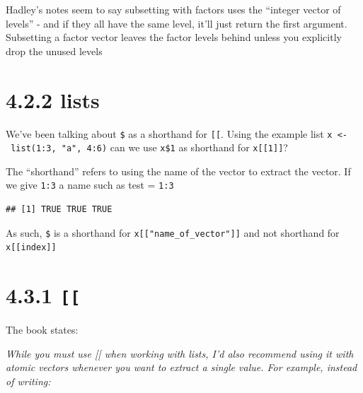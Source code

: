 \documentclass[]{book}
\newenvironment{Shaded}{\begin{snugshade}}{\end{snugshade}}
\newcommand{\DataTypeTok}[1]{\textcolor[rgb]{0.13,0.29,0.53}{#1}}
\newcommand{\DecValTok}[1]{\textcolor[rgb]{0.00,0.00,0.81}{#1}}
\newcommand{\KeywordTok}[1]{\textcolor[rgb]{0.13,0.29,0.53}{\textbf{#1}}}
\newcommand{\NormalTok}[1]{#1}
\newcommand{\OperatorTok}[1]{\textcolor[rgb]{0.81,0.36,0.00}{\textbf{#1}}}
\newcommand{\StringTok}[1]{\textcolor[rgb]{0.31,0.60,0.02}{#1}}
\begin{document}
Hadley's notes seem to say subsetting with factors uses the ``integer vector of levels'' - and if they all have the same level, it'll just return the first argument. Subsetting a factor vector leaves the factor levels behind unless you explicitly drop the unused levels

\hypertarget{lists_4}{%
\section*{4.2.2 lists}\label{lists_4}}

We've been talking about \texttt{\$} as a shorthand for \texttt{{[}{[}}. Using the example list \texttt{x\ \textless{}-\ list(1:3,\ "a",\ 4:6)} can we use \texttt{x\$1} as shorthand for \texttt{x{[}{[}1{]}{]}}?

The ``shorthand'' refers to using the name of the vector to extract the vector. If we give \texttt{1:3} a name such as test = \texttt{1:3}

\begin{Shaded}
\end{Shaded}

\begin{verbatim}
## [1] TRUE TRUE TRUE
\end{verbatim}

As such, \texttt{\$} is a shorthand for \texttt{x{[}{[}"name\_of\_vector"{]}{]}} and not shorthand for \texttt{x{[}{[}index{]}{]}}

\hypertarget{subset_2}{%
\section*{\texorpdfstring{4.3.1 \texttt{{[}{[}}}{4.3.1 {[}{[}}}\label{subset_2}}
\addcontentsline{toc}{section}{4.3.1 \texttt{{[}{[}}}

The book states:

\emph{While you must use {[}{[} when working with lists, I'd also recommend using it with atomic vectors whenever you want to extract a single value. For example, instead of writing:}
\end{document}
